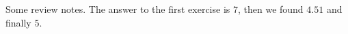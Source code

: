 \documentclass[12pt]{article}
\begin{document}
Some review notes. The answer to the first exercise is $\boxed{7}$, then we
found $\boxed{4.51}$ and finally $\boxed{5}$.
\end{document}
